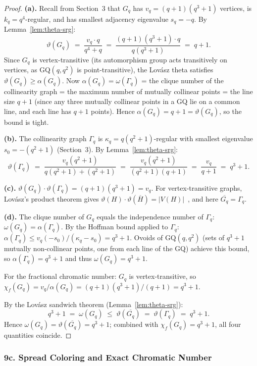 \begin{proof}
\textbf{(a).}  Recall from Section~3 that $G_q$ has $v_q=(q+1)(q^3+1)$ vertices, is $k_q=q^4$-regular, and has smallest adjacency eigenvalue $s_q=-q$.  By Lemma~\ref{lem:theta-srg}:
\[
  \vartheta(G_q) \;=\; \frac{v_q\cdot q}{q^4+q} \;=\; \frac{(q+1)(q^3+1)\cdot q}{q(q^3+1)} \;=\; q+1.
\]
Since $G_q$ is vertex-transitive (its automorphism group acts transitively on vertices, as $\mathrm{GQ}(q,q^2)$ is point-transitive), the Lov\'asz theta satisfies $\vartheta(G_q)\ge\alpha(G_q)$.  Now $\alpha(G_q)=\omega(\Gamma_q)$ = the clique number of the collinearity graph = the maximum number of mutually collinear points = the line size $q+1$ (since any three mutually collinear points in a GQ lie on a common line, and each line has $q+1$ points).  Hence $\alpha(G_q)=q+1=\vartheta(G_q)$, so the bound is tight.

\textbf{(b).}  The collinearity graph $\Gamma_q$ is $\kappa_q=q(q^2+1)$-regular with smallest eigenvalue $s_0=-(q^2+1)$ (Section~3).  By Lemma~\ref{lem:theta-srg}:
\[
  \vartheta(\Gamma_q) \;=\; \frac{v_q(q^2+1)}{q(q^2+1)+(q^2+1)} \;=\; \frac{v_q(q^2+1)}{(q^2+1)(q+1)} \;=\; \frac{v_q}{q+1} \;=\; q^3+1.
\]

\textbf{(c).}  $\vartheta(G_q)\cdot\vartheta(\Gamma_q)=(q+1)(q^3+1)=v_q$.  For vertex-transitive graphs, Lov\'asz's product theorem gives $\vartheta(H)\cdot\vartheta(\overline{H})=|V(H)|$~\cite{Lovasz1979}, and here $\overline{G_q}=\Gamma_q$.

\textbf{(d).}  The clique number of $G_q$ equals the independence number of $\Gamma_q$: $\omega(G_q)=\alpha(\Gamma_q)$.  By the Hoffman bound applied to $\Gamma_q$: $\alpha(\Gamma_q)\le v_q(-s_0)/(\kappa_q-s_0)=q^3+1$.  Ovoids of $\mathrm{GQ}(q,q^2)$ (sets of $q^3+1$ mutually non-collinear points, one from each line of the GQ) achieve this bound, so $\alpha(\Gamma_q)=q^3+1$ and thus $\omega(G_q)=q^3+1$.

For the fractional chromatic number: $G_q$ is vertex-transitive, so $\chi_f(G_q)=v_q/\alpha(G_q)=(q+1)(q^3+1)/(q+1)=q^3+1$.

By the Lov\'asz sandwich theorem (Lemma~\ref{lem:theta-srg}):
\[
  q^3+1 \;=\;\omega(G_q)\;\le\;\vartheta(\overline{G_q})\;=\;\vartheta(\Gamma_q)\;=\;q^3+1.
\]
Hence $\omega(G_q)=\vartheta(\overline{G_q})=q^3+1$; combined with $\chi_f(G_q)=q^3+1$, all four quantities coincide.
\end{proof}

\subsubsection*{9c. Spread Coloring and Exact Chromatic Number}

